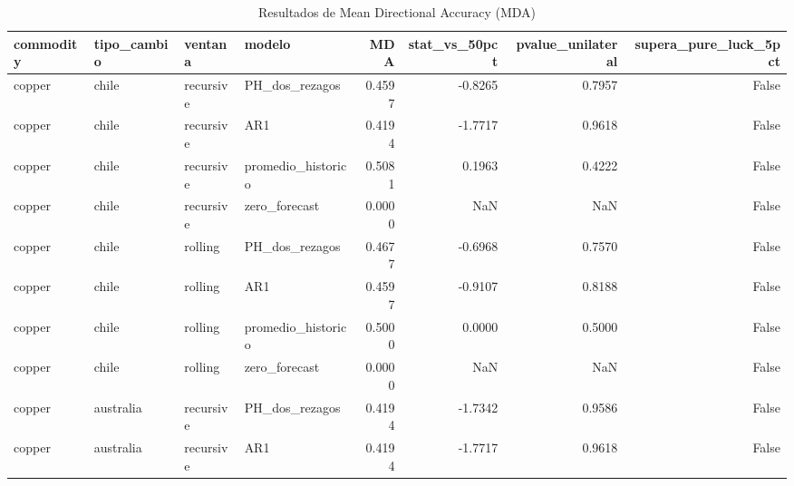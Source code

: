 \begin{table}
\caption{Resultados de Mean Directional Accuracy (MDA)}
\label{tab:mda}
\begin{tabular}{llllrrrr}
\toprule
commodity & tipo_cambio & ventana & modelo & MDA & stat_vs_50pct & pvalue_unilateral & supera_pure_luck_5pct \\
\midrule
copper & chile & recursive & PH_dos_rezagos & 0.4597 & -0.8265 & 0.7957 & False \\
copper & chile & recursive & AR1 & 0.4194 & -1.7717 & 0.9618 & False \\
copper & chile & recursive & promedio_historico & 0.5081 & 0.1963 & 0.4222 & False \\
copper & chile & recursive & zero_forecast & 0.0000 & NaN & NaN & False \\
copper & chile & rolling & PH_dos_rezagos & 0.4677 & -0.6968 & 0.7570 & False \\
copper & chile & rolling & AR1 & 0.4597 & -0.9107 & 0.8188 & False \\
copper & chile & rolling & promedio_historico & 0.5000 & 0.0000 & 0.5000 & False \\
copper & chile & rolling & zero_forecast & 0.0000 & NaN & NaN & False \\
copper & australia & recursive & PH_dos_rezagos & 0.4194 & -1.7342 & 0.9586 & False \\
copper & australia & recursive & AR1 & 0.4194 & -1.7717 & 0.9618 & False \\
\bottomrule
\end{tabular}
\end{table}
